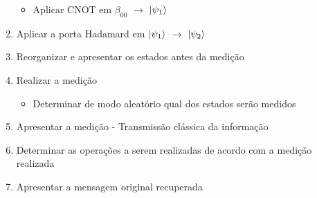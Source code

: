 \documentclass[11pt,oneside,brazil,hidelinks,article,sumario=tradicional,a4paper]{abntex2}
\begin{document}
\begin{enumerate}
\begin{itemize}
	\item Aplicar CNOT em $\beta _00$ $\rightarrow$ $\ket{\psi _1}$
	\end{itemize}
\item Aplicar a porta Hadamard em $\ket{\psi _1}$ $\rightarrow$ $\ket{\psi _2}$
\item Reorganizar e apresentar os estados antes da medição
\item Realizar a medição
	\begin{itemize}
	\item Determinar de modo aleatório qual dos estados serão medidos
	\end{itemize}
\item Apresentar a medição - Transmissão clássica da informação
\item Determinar as operações a serem realizadas de acordo com a medição realizada
\item Apresentar a mensagem original recuperada	
\end{enumerate}
\end{document}
